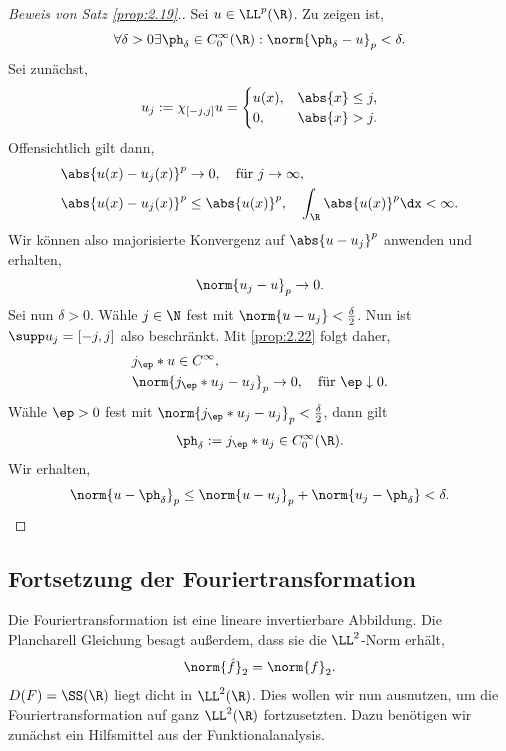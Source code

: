 \begin{proof}[Beweis von Satz \ref{prop:2.19}.]
Sei $u\in\LL^p(\R)$. Zu zeigen ist,
\begin{align*}
\forall\delta > 0 \exists \ph_\delta \in C_0^\infty(\R) : \norm{\ph_\delta-u}_p
<\delta.
\end{align*}
Sei zunächst,
\begin{align*}
u_j := \chi_{[-j,j]}u = \begin{cases}
                        u(x), & \abs{x}\le j,\\
                        0, &\abs{x} >j.
                        \end{cases}
\end{align*}
Offensichtlich gilt dann,
\begin{align*}
&\abs{u(x)-u_j(x)}^p \to 0,\quad \text{für }j\to\infty,\\
&\abs{u(x)-u_j(x)}^p \le \abs{u(x)}^p,\quad \int_\R \abs{u(x)}^p \dx <\infty.
\end{align*}
Wir können also majorisierte Konvergenz auf $\abs{u-u_j}^p$ anwenden und
erhalten,
\begin{align*}
\norm{u_j-u}_p \to 0.
\end{align*}
Sei nun $\delta > 0$. Wähle $j\in\N$ fest mit
$\norm{u-u_j}<\frac{\delta}{2}$. Nun ist $\supp u_j = [-j,j]$ also beschränkt.
Mit \ref{prop:2.22} folgt daher,
\begin{align*}
&j_\ep*u\in C^\infty,\\
&\norm{j_\ep*u_j - u_j}_p \to 0,\quad \text{für }\ep\downarrow 0. 
\end{align*}
Wähle $\ep >0$ fest mit $\norm{j_\ep*u_j - u_j}_p<\frac{\delta}{2}$, dann gilt
\begin{align*}
\ph_\delta := j_\ep*u_j \in C_0^\infty(\R).
\end{align*}
Wir erhalten,
\begin{align*}
\norm{u-\ph_\delta}_p \le \norm{u-u_j}_p + \norm{u_j-\ph_\delta}<
\delta.\qedhere
\end{align*}
\end{proof}

\subsection{Fortsetzung der Fouriertransformation}

Die Fouriertransformation ist eine lineare invertierbare Abbildung. Die 
Plancharell Gleichung besagt außerdem, dass sie die $\LL^2$-Norm erhält,
\begin{align*}
\norm{\hat{f}}_2 = \norm{f}_2.
\end{align*}
$D(F)=\SS(\R)$ liegt dicht in $\LL^2(\R)$. Dies wollen wir nun ausnutzen, um
die Fouriertransformation auf ganz $\LL^2(\R)$ fortzusetzten. Dazu benötigen
wir zunächst ein Hilfsmittel aus der Funktionalanalysis.

